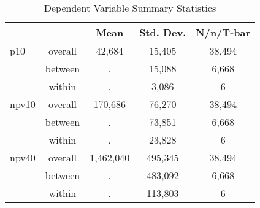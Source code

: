 \begin{table}[htbp]\centering
\caption{Dependent Variable Summary Statistics}
\begin{tabular}{lc*{3}{c}}
\hline\hline
            &            &        Mean&   Std. Dev.&   N/n/T-bar\\
\hline
p10         &  overall   &      42,684&      15,405&      38,494\\
            &  between   &           .&      15,088&       6,668\\
            &   within   &           .&       3,086&           6\\
npv10       &  overall   &     170,686&      76,270&      38,494\\
            &  between   &           .&      73,851&       6,668\\
            &   within   &           .&      23,828&           6\\
npv40       &  overall   &   1,462,040&     495,345&      38,494\\
            &  between   &           .&     483,092&       6,668\\
            &   within   &           .&     113,803&           6\\
\hline\hline
\end{tabular}
\end{table}
